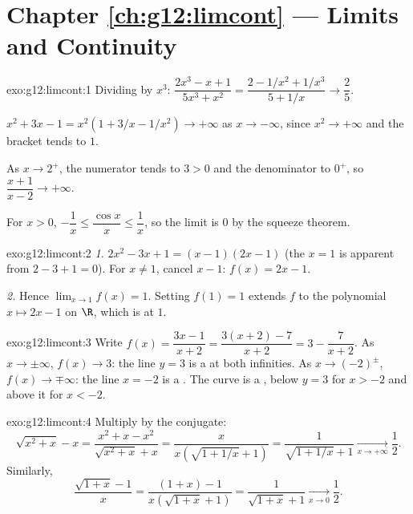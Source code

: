 \section*{Chapter \ref{ch:g12:limcont} --- Limits and Continuity}

\begin{solution}{exo:g12:limcont:1}
Dividing by $x^3$:
$\dfrac{2x^3 - x + 1}{5x^3 + x^2} = \dfrac{2 - 1/x^2 + 1/x^3}{5 + 1/x}
\to \dfrac{2}{5}$.

$x^2 + 3x - 1 = x^2(1 + 3/x - 1/x^2) \to +\infty$ as $x \to -\infty$, since
$x^2 \to +\infty$ and the bracket tends to $1$.

As $x \to 2^+$, the numerator tends to $3 > 0$ and the denominator to $0^+$,
so $\dfrac{x+1}{x-2} \to +\infty$.

For $x > 0$, $-\dfrac1x \leq \dfrac{\cos x}{x} \leq \dfrac1x$, so the limit
is $0$ by the squeeze theorem.
\end{solution}

\begin{solution}{exo:g12:limcont:2}
\emph{1.} $2x^2 - 3x + 1 = (x-1)(2x-1)$ (the  $x=1$ is apparent from
$2 - 3 + 1 = 0$). For $x \neq 1$, cancel $x - 1$: $f(x) = 2x - 1$.

\emph{2.} Hence $\lim_{x\to1} f(x) = 1$. Setting $f(1) = 1$ extends $f$ to
the polynomial  $x \mapsto 2x-1$ on $\R$, which is  at $1$.
\end{solution}

\begin{solution}{exo:g12:limcont:3}
Write $f(x) = \dfrac{3x - 1}{x + 2} = \dfrac{3(x+2) - 7}{x+2}
= 3 - \dfrac{7}{x+2}$. As $x \to \pm\infty$, $f(x) \to 3$: the line $y = 3$
is a  at both infinities. As $x \to (-2)^\pm$,
$f(x) \to \mp\infty$: the line $x = -2$ is a . The curve is
a , below $y=3$ for $x > -2$ and above it for $x < -2$.
\end{solution}

\begin{solution}{exo:g12:limcont:4}
Multiply by the conjugate:
\[
\sqrt{x^2 + x} - x = \frac{x^2 + x - x^2}{\sqrt{x^2+x} + x}
= \frac{x}{x\left(\sqrt{1 + 1/x} + 1\right)}
= \frac{1}{\sqrt{1 + 1/x} + 1}
\xrightarrow[x\to+\infty]{} \frac{1}{2}.
\]
Similarly,
\[
\frac{\sqrt{1+x} - 1}{x} = \frac{(1+x) - 1}{x\left(\sqrt{1+x} + 1\right)}
= \frac{1}{\sqrt{1+x} + 1} \xrightarrow[x\to0]{} \frac{1}{2}.
\]
\end{solution}

